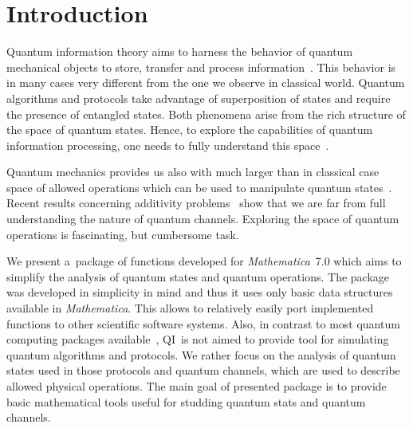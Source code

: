 \documentclass[final,5p,times]{elsarticle}
\newcommand{\Mathematica}{\emph{Mathematica}}
\newcommand{\1}{{\rm 1\hspace{-0.9mm}l}}
\newcommand{\qi}{QI}
\begin{document}
\tableofcontents


\section{Introduction}\label{sec:intro}
Quantum information theory aims to harness the behavior of quantum mechanical
objects to store, transfer and process information~\cite{hayashi}. This behavior
is in many cases very different from the one we observe in classical world.
Quantum algorithms and protocols take advantage of superposition of states and
require the presence of entangled states. Both phenomena arise from the rich
structure of the space of quantum states. Hence, to explore the capabilities of
quantum information processing, one needs to fully understand this
space~\cite{BZ06}. 

Quantum mechanics provides us also with much larger than in classical case space
of allowed operations which can be used to manipulate quantum
states~\cite{hayashi,BZ06}. Recent results concerning additivity
problems~\cite{hastings09superadditivity} show that we are far from full
understanding the nature of quantum channels. Exploring the space of quantum
operations is fascinating, but cumbersome task.


We present a~package of functions developed for \Mathematica\ 7.0 which aims to
simplify the analysis of quantum states and quantum operations. The package was 
developed in simplicity in mind and thus it uses only basic data structures
available in \Mathematica. This allows to relatively easily port implemented
functions to other scientific software systems. Also, in contrast to most
quantum computing packages available~\cite{qdensity,qucalc,quantum2}, \qi\ is
not aimed to provide tool for simulating quantum algorithms and protocols. We
rather focus on the analysis of quantum states used in those protocols and
quantum channels, which are used to describe allowed physical operations. The
main goal of presented package is to provide basic mathematical tools useful for
studding quantum stats and quantum channels.
\end{document}
